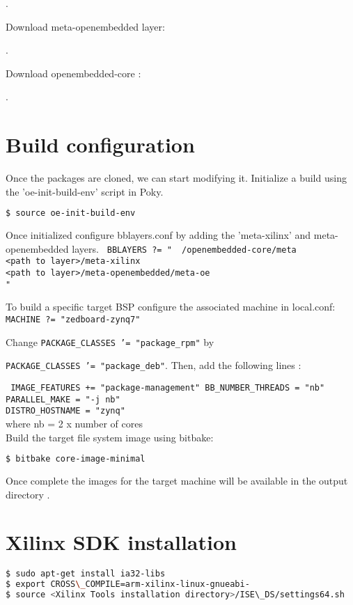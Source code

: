 .

Download meta-openembedded layer:

.

Download openembedded-core :

.



\section{Build configuration}

Once the packages are cloned, we can start modifying it.
Initialize a build using the 'oe-init-build-env' script in Poky.
\begin{lstlisting}[language=bash]
$ source oe-init-build-env
\end{lstlisting}

Once initialized configure bblayers.conf by adding the 'meta-xilinx' and meta-openembedded layers.
\texttt{
	BBLAYERS ?= " \
		<path to layer>/openembedded-core/meta \ \\
		<path to layer>/meta-xilinx \ \\
	    <path to layer>/meta-openembedded/meta-oe \ \\
		"
} 

To build a specific target BSP configure the associated machine in local.conf:
\texttt{
	MACHINE ?= "zedboard-zynq7"
}

Change 	\texttt{PACKAGE\_CLASSES '= "package\_rpm"} by

\texttt{PACKAGE\_CLASSES '= "package\_deb"}. Then, add the following lines :

\texttt{
IMAGE\_FEATURES += "package-management"
BB\_NUMBER\_THREADS = "nb" \\
PARALLEL\_MAKE = "-j nb"\\
DISTRO\_HOSTNAME = "zynq"\\
}
where nb = 2 x number of cores \\


Build the target file system image using bitbake:
\begin{lstlisting}[language=bash]
	$ bitbake core-image-minimal
\end{lstlisting}
Once complete the images for the target machine will be available in the output directory .


\section{Xilinx SDK installation}

\begin{lstlisting}[language=bash]
$ sudo apt-get install ia32-libs
$ export CROSS\_COMPILE=arm-xilinx-linux-gnueabi-
$ source <Xilinx Tools installation directory>/ISE\_DS/settings64.sh
\end{lstlisting}


